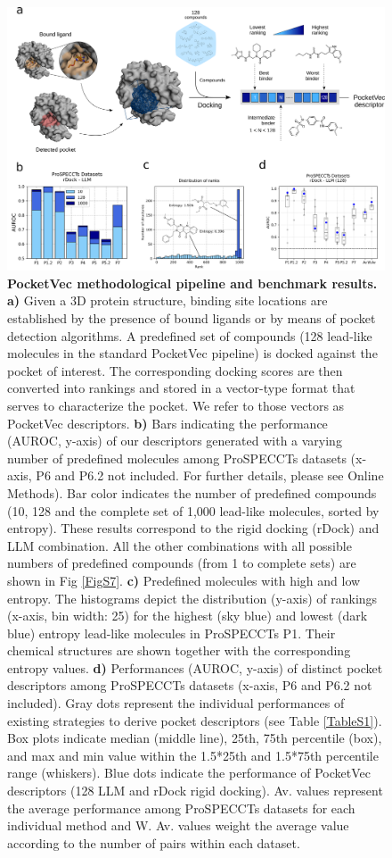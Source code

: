 \begin{figure}[htbp]
  \centering
  \includegraphics[width=\linewidth]{figures/PocketVec/Main/Fig1.png} 
  \caption{
    \textbf{PocketVec methodological pipeline and benchmark results.} 
    \textbf{a)} Given a 3D protein structure, binding site locations are established by the presence of bound ligands or by means of pocket detection algorithms. A predefined set of compounds (128 lead-like molecules in the standard PocketVec pipeline) is docked against the pocket of interest. The corresponding docking scores are then converted into rankings and stored in a vector-type format that serves to characterize the pocket. We refer to those vectors as PocketVec descriptors.
    \textbf{b)} Bars indicating the performance (AUROC, y-axis) of our descriptors generated with a varying number of predefined molecules among ProSPECCTs datasets (x-axis, P6 and P6.2 not included. For further details, please see Online Methods). Bar color indicates the number of predefined compounds (10, 128 and the complete set of 1,000 lead-like molecules, sorted by entropy). These results correspond to the rigid docking (rDock) and LLM combination. All the other combinations with all possible numbers of predefined compounds (from 1 to complete sets) are shown in Fig \ref{FigS7}.
    \textbf{c)} Predefined molecules with high and low entropy. The histograms depict the distribution (y-axis) of rankings (x-axis, bin width: 25) for the highest (sky blue) and lowest (dark blue) entropy lead-like molecules in ProSPECCTs P1. Their chemical structures are shown together with the corresponding entropy values.
    \textbf{d)} Performances (AUROC, y-axis) of distinct pocket descriptors among ProSPECCTs datasets (x-axis, P6 and P6.2 not included). Gray dots represent the individual performances of existing strategies to derive pocket descriptors (see Table \ref{TableS1}). Box plots indicate median (middle line), 25th, 75th percentile (box), and max and min value within the 1.5*25th and 1.5*75th percentile range (whiskers). Blue dots indicate the performance of PocketVec descriptors (128 LLM and rDock rigid docking). Av. values represent the average performance among ProSPECCTs datasets for each individual method and W. Av. values weight the average value according to the number of pairs within each dataset.
  }
  \label{Fig1}
\end{figure}


